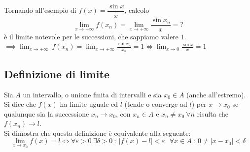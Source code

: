\documentclass[../../main.tex]{subfiles}
\begin{document}
Tornando all'esempio di $f(x) = \dfrac{\sin x}{x}$, calcolo
\[
    \lim_{x\to+\infty} f(x_n) = \lim_{x\to+\infty} \frac{\sin x_n}{x} = ?
\]
è il limite notevole per le successioni, che sappiamo valere $1$.\\
$\implies \lim_{x\to +\infty} \ f(x_n) = \lim_{x\to +\infty} \frac{\sin x_n}{x_n} = 1 \iff \lim_{x\to 0} \frac{\sin x}{x} = 1$\\
\begin{center}
\end{center}

\subsection{Definizione di limite}
Sia $A$ un intervallo, o unione finita di intervalli e sia $x_0 \in A$ (anche
all'estremo).\\ Si dice che $f(x)$ ha limite uguale ed $l$ (tende o converge ad
$l$) per $x \to x_0$ se qualunque sia la successione $x_n \to x_0$, con $x_n\in
    A$ e $x_n \neq x_0 \ \forall n$ risulta che $f(x_n) \to l$.\\ Si dimostra che
questa definizione è equivalente alla seguente:
\[
    \lim_{x\to x_0} f(x) = l \iff \forall \varepsilon > 0 \ \exists \delta > 0 \ : \ |f(x) - l| < \varepsilon \ \ \ \forall x \in A \ : \ 0 \neq |x - x_0| < \delta
\]
\end{document}
